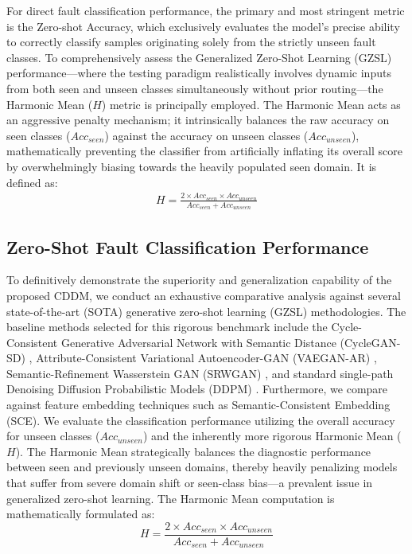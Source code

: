 For direct fault classification performance, the primary and most stringent metric is the Zero-shot Accuracy, which exclusively evaluates the model's precise ability to correctly classify samples originating solely from the strictly unseen fault classes. To comprehensively assess the Generalized Zero-Shot Learning (GZSL) performance—where the testing paradigm realistically involves dynamic inputs from both seen and unseen classes simultaneously without prior routing—the Harmonic Mean ($H$) metric is principally employed. The Harmonic Mean acts as an aggressive penalty mechanism; it intrinsically balances the raw accuracy on seen classes ($Acc_{seen}$) against the accuracy on unseen classes ($Acc_{unseen}$), mathematically preventing the classifier from artificially inflating its overall score by overwhelmingly biasing towards the heavily populated seen domain. It is defined as:
\begin{align}
    H = \frac{2 \times Acc_{seen} \times Acc_{unseen}}{Acc_{seen} + Acc_{unseen}} \label{eq:harmonic_mean}
\end{align}

\subsection{Zero-Shot Fault Classification Performance}

To definitively demonstrate the superiority and generalization capability of the proposed CDDM, we conduct an exhaustive comparative analysis against several state-of-the-art (SOTA) generative zero-shot learning (GZSL) methodologies. The baseline methods selected for this rigorous benchmark include the Cycle-Consistent Generative Adversarial Network with Semantic Distance (CycleGAN-SD) \cite{liao2024cyclegan}, Attribute-Consistent Variational Autoencoder-GAN (VAEGAN-AR) \cite{wang2020deep}, Semantic-Refinement Wasserstein GAN (SRWGAN) \cite{wang2020deep}, and standard single-path Denoising Diffusion Probabilistic Models (DDPM) \cite{wang2020deep}. Furthermore, we compare against feature embedding techniques such as Semantic-Consistent Embedding (SCE). We evaluate the classification performance utilizing the overall accuracy for unseen classes ($Acc_{unseen}$) and the inherently more rigorous Harmonic Mean ($H$). The Harmonic Mean strategically balances the diagnostic performance between seen and previously unseen domains, thereby heavily penalizing models that suffer from severe domain shift or seen-class bias—a prevalent issue in generalized zero-shot learning. The Harmonic Mean computation is mathematically formulated as:
\begin{equation}
    \label{eq:harmonic_mean}
    H = \frac{2 \times Acc_{seen} \times Acc_{unseen}}{Acc_{seen} + Acc_{unseen}}
\end{equation}

